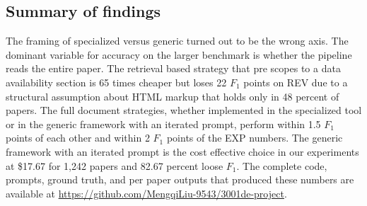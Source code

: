 \documentclass[sigconf,nonacm]{acmart}
\begin{document}
\subsection{Summary of findings}

The framing of specialized versus generic turned out to be the wrong axis. The dominant variable for accuracy on the larger benchmark is whether the pipeline reads the entire paper. The retrieval based strategy that pre scopes to a data availability section is 65 times cheaper but loses 22 $F_1$ points on REV due to a structural assumption about HTML markup that holds only in 48 percent of papers. The full document strategies, whether implemented in the specialized tool or in the generic framework with an iterated prompt, perform within 1.5 $F_1$ points of each other and within 2 $F_1$ points of the EXP numbers. The generic framework with an iterated prompt is the cost effective choice in our experiments at \$17.67 for 1{,}242 papers and 82.67 percent loose $F_1$. The complete code, prompts, ground truth, and per paper outputs that produced these numbers are available at \url{https://github.com/MengqiLiu-9543/3001de-project}.
\end{document}

